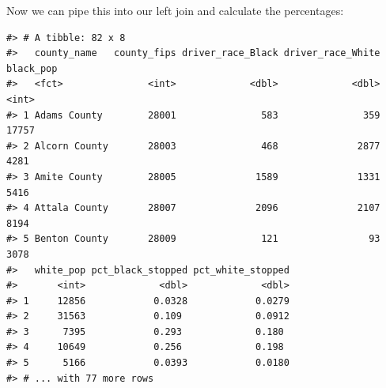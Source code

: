 \documentclass[]{book}
\newenvironment{Shaded}{\begin{snugshade}}{\end{snugshade}}
\newcommand{\KeywordTok}[1]{\textcolor[rgb]{0.13,0.29,0.53}{\textbf{#1}}}
\newcommand{\DataTypeTok}[1]{\textcolor[rgb]{0.13,0.29,0.53}{#1}}
\newcommand{\DecValTok}[1]{\textcolor[rgb]{0.00,0.00,0.81}{#1}}
\newcommand{\StringTok}[1]{\textcolor[rgb]{0.31,0.60,0.02}{#1}}
\newcommand{\CommentTok}[1]{\textcolor[rgb]{0.56,0.35,0.01}{\textit{#1}}}
\newcommand{\OtherTok}[1]{\textcolor[rgb]{0.56,0.35,0.01}{#1}}
\newcommand{\OperatorTok}[1]{\textcolor[rgb]{0.81,0.36,0.00}{\textbf{#1}}}
\newcommand{\NormalTok}[1]{#1}
\theoremstyle{definition}
\theoremstyle{definition}
\theoremstyle{definition}
\theoremstyle{remark}
\begin{document}
Now we can pipe this into our left join and calculate the percentages:

\begin{Shaded}
\end{Shaded}

\begin{verbatim}
#> # A tibble: 82 x 8
#>   county_name   county_fips driver_race_Black driver_race_White black_pop
#>   <fct>               <int>             <dbl>             <dbl>     <int>
#> 1 Adams County        28001               583               359     17757
#> 2 Alcorn County       28003               468              2877      4281
#> 3 Amite County        28005              1589              1331      5416
#> 4 Attala County       28007              2096              2107      8194
#> 5 Benton County       28009               121                93      3078
#>   white_pop pct_black_stopped pct_white_stopped
#>       <int>             <dbl>             <dbl>
#> 1     12856            0.0328            0.0279
#> 2     31563            0.109             0.0912
#> 3      7395            0.293             0.180 
#> 4     10649            0.256             0.198 
#> 5      5166            0.0393            0.0180
#> # ... with 77 more rows
\end{verbatim}
\end{document}
